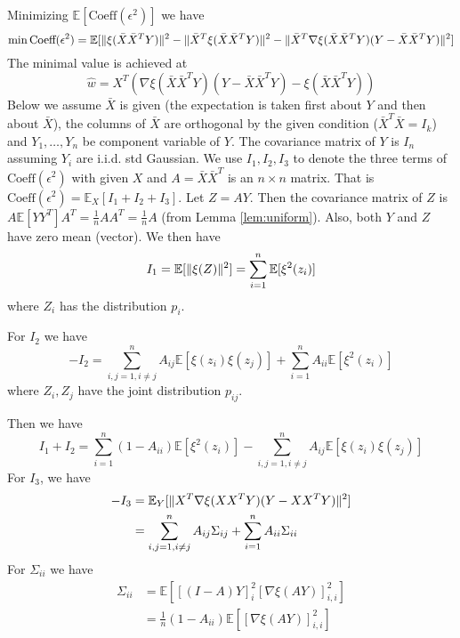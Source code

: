 \documentclass{article}
\DeclarePairedDelimiter\norm{\lVert}{\rVert}
\def\E{\mathbb{E}}
\begin{document}
Minimizing $\E[\textrm{Coeff}(\epsilon^2)]$ we have
\begin{equation}
\min \textrm{Coeff}(\epsilon^2) = \E[\norm{\xi(\bar{X}\bar{X}^TY)}^2 - \norm{\bar{X}^T\xi(\bar{X}\bar{X}^TY)}^2 - \norm{\bar{X}^T \nabla\xi(\bar{X}\bar{X}^TY)(Y-\bar{X}\bar{X}^TY)}^2]
\end{equation}
The minimal value is achieved at 
$$
\hat{w} =  X^T(\nabla\xi(\bar{X}\bar{X}^T Y)
(Y-\bar{X}\bar{X}^T Y) - \xi(\bar{X}\bar{X}^T Y))
$$
Below we assume $\bar{X}$ is given (the expectation is taken first about $Y$ and then about $\bar{X}$), the columns of $\bar{X}$ are orthogonal by the given condition ($\bar{X}^T\bar{X}=I_k$) and $Y_1, \dots, Y_n $ be component variable of $Y$. The covariance matrix of $Y$ is $I_n$ assuming $Y_i$ are i.i.d. std Gaussian. We use $I_1, I_2, I_3$ to denote the three terms of $\textrm{Coeff}(\epsilon^2)$ with given $X$ and $A=\bar{X}\bar{X}^T$ is an $n\times n$ matrix. That is $ \textrm{Coeff}(\epsilon^2) = \E_{X} [I_1 + I_2 + I_3]$.
Let $Z = AY$. Then the covariance matrix of $Z$ is $A\E[YY^T]A^T = \frac{1}{n}AA^T = \frac{1}{n}A$ (from Lemma \ref{lem:uniform}).
Also, both $Y$ and $Z$ have zero mean (vector). We then have
\begin{equation*}
I_1 =\E[\norm{\xi(Z)}^2] = \sum_{i=1}^n \E[\xi^2(z_i)]
\end{equation*}
where $Z_i$ has the distribution $p_i$.
 
For $I_2$
we have
\begin{equation*}
-I_2   = \sum_{i,j=1, i \neq j}^n A_{ij}\E[\xi(z_i)\xi(z_j)] + \sum_{i=1}^n A_{ii}  \E[\xi^2(z_i)]
\end{equation*}
where $Z_i, Z_j$ have the joint distribution $p_{ij}$.

Then we have
\begin{equation}\label{eq:I1plusI2}
I_1+ I_2 =   \sum_{i=1}^n (1-A_{ii}) \E[\xi^2(z_i)]  - \sum_{i,j=1, i \neq j}^n A_{ij}\E[\xi(z_i)\xi(z_j)] 
\end{equation}
For $I_3$, we have
\begin{align*}
-I_3 & = \E_Y[\norm{X^T \nabla\xi(XX^TY)(Y-XX^TY)}^2] \\ 
 & = \sum_{i,j=1, i \neq j}^n A_{ij}\Sigma_{ij} + \sum_{i=1}^n A_{ii}\Sigma_{ii} 
\end{align*}
For $\Sigma_{ii}$ we have
\begin{align}\label{eq:sigmaii}
\Sigma_{ii} &=  \E[ [(I-A)Y]_i^2 [\nabla \xi(AY)]_{i,i}^2] \\
&= \frac{1}{n}(1-A_{ii}) \E[ [\nabla \xi(AY)]_{i,i}^2]
\end{align}
\end{document}
